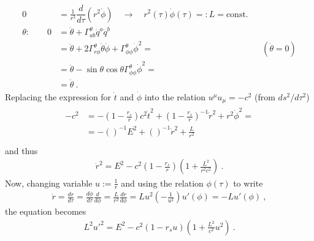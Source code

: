 \documentclass[letterpaper,10pt,english]{jupyterBook}
\begin{document}
\begin{equation*}
\begin{split}
\begin{aligned}
  0 & = \frac{1}{r^2} \dfrac{d}{d \tau} \left( r^2 \dot{\phi} \right) \quad \rightarrow \quad r^2(\tau) \dot{\phi}(\tau) =: L = \text{const.} \\
  \theta : \qquad 
  0 & = \ddot{\theta} + \Gamma_{ab}^{\theta} \dot{q}^a \dot{q}^b  \\
    & = \ddot{\theta} + 2 \Gamma_{r \phi}^\theta \dot{\theta} \dot{\phi} + \Gamma_{\phi \phi}^\theta \dot{\phi}^2 = && ( \dot{\theta} = 0 ) \\
    & = \ddot{\theta} - \sin \theta \cos \theta \Gamma_{\phi \phi}^\theta \dot{\phi}^2 = \\
    & = \ddot{\theta} \ .
\end{aligned}\end{split}
\end{equation*}
\sphinxAtStartPar
Replacing the expression for \(\dot{t}\) and \(\dot{\phi}\) into the relation \(u^\mu u_{\mu} = - c^2\) (from \(ds^2/d \tau^2\))
\begin{equation*}
\begin{split}\begin{aligned}
  -c^2 
  & = - \left( 1 - \frac{r_s}{r} \right) c^2 \dot{t}^2 + \left( 1 - \frac{r_s}{r} \right)^{-1} \dot{r}^2 + r^2 \dot{\phi}^2 = \\
  & = - \left( \right)^{-1} E^2  + \left(  \right)^{-1} \dot{r}^2 + \frac{L}{r^2} \\
\end{aligned}\end{split}
\end{equation*}
\sphinxAtStartPar
and thus
\begin{equation*}
\begin{split}
  \dot{r}^2 = E^2 - c^2 \left( 1 - \frac{r_s}{r} \right) \left( 1 + \frac{L^2}{r^2 c^2} \right) \ .
\end{split}
\end{equation*}
\sphinxAtStartPar
Now, changing variable \(u := \frac{1}{r}\) and using the relation \(\phi(\tau)\) to write
\begin{equation*}
\begin{split}\dot{r} = \frac{d r}{d\tau} = \frac{d \phi}{d \tau} \frac{d}{d \phi} = \frac{L}{r^2} \frac{d r}{d \phi} = L u^2 \left( - \frac{1}{u^2} \right) u'(\phi) = - L u'(\phi) \ ,\end{split}
\end{equation*}
\sphinxAtStartPar
the equation becomes
\begin{equation*}
\begin{split} L^2 {u'}^2 = E^2 - c^2 ( 1 - r_s u ) \left( 1 + \frac{L^2}{c^2} u^2 \right) \ .\end{split}
\end{equation*}
\end{document}
